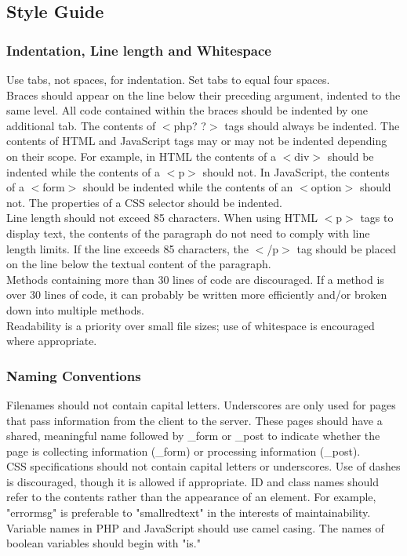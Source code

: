 %

	\subsection{Style Guide}
	
		\subsubsection{Indentation, Line length and Whitespace}
			Use tabs, not spaces, for indentation. Set tabs to equal four spaces.\\Braces should appear on the line below their preceding argument, indented to the same level. All code contained within the braces should be indented by one additional tab. The contents of $<$php? ?$>$ tags should always be indented. The contents of HTML and JavaScript tags may or may not be indented depending on their scope. For example, in HTML the contents of a $<$div$>$ should be indented while the contents of a $<$p$>$ should not. In JavaScript, the contents of a $<$form$>$ should be indented while the contents of an $<$option$>$ should not. The properties of a CSS selector should be indented.\\Line length should not exceed 85 characters. When using HTML $<$p$>$ tags to display text, the contents of the paragraph do not need to comply with line length limits. If the line exceeds 85 characters, the $<$/p$>$ tag should be placed on the line below the textual content of the paragraph.\\Methods containing more than 30 lines of code are discouraged. If a method is over 30 lines of code, it can probably be written more efficiently and/or broken down into multiple methods.\\Readability is a priority over small file sizes; use of whitespace is encouraged where appropriate.
			
		\subsubsection{Naming Conventions}
			Filenames should not contain capital letters. Underscores are only used for pages that pass information from the client to the server. These pages should have a shared, meaningful name followed by \_form or \_post to indicate whether the page is collecting information (\_form) or processing information (\_post).\\CSS specifications should not contain capital letters or underscores. Use of dashes is discouraged, though it is allowed if appropriate. ID and class names should refer to the contents rather than the appearance of an element. For example, "errormsg" is preferable to "smallredtext" in the interests of maintainability.\\Variable names in PHP and JavaScript should use camel casing. The names of boolean variables should begin with "is."
			
